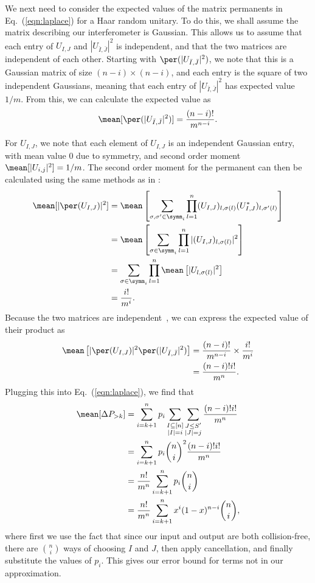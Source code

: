 We next need to consider the expected values of the matrix permanents in Eq.\ (\ref{eqn:laplace}) for a Haar random unitary. 
To do this, we shall assume the matrix describing our interferometer is Gaussian. 
This allows us to assume that each entry of $U_{I,J}$ and $|U_{\bar{I},\bar{J}}|^2$ is independent, and that the two matrices are independent of each other. 
Starting with $\per(|U_{\bar{I},\bar{J}}|^2)$, we note that this is a Gaussian matrix of size $(n-i)\times(n-i)$, and each entry is the square of two independent Gaussians, meaning that each entry of $|U_{\bar{I},\bar{J}}|^2$ has expected value $1/m$. 
From this, we can calculate the expected value as
\begin{equation}
\mean[\per(|U_{\bar{I},\bar{J}}|^2)] = \frac{(n-i)!}{m^{n-i}}.
\end{equation}

For $U_{I,J}$, we note that each element of $U_{I,J}$ is an independent Gaussian entry, with mean value $0$ due to symmetry, and second order moment $\mean[|U_{i,j}|^2] = 1/m$. The second order moment for the permanent can then be calculated using the same methods as in \cite{aaronson2011}:
\begin{align}
\mean[|\per(U_{I,J})|^2] &= \mean\left[\sum_{\sigma,\sigma'\in\symm_i}\prod_{l=1}^n(U_{I,J})_{l,\sigma(l)}(U^*_{I,J})_{l,\sigma'(l)}\right]\\
&= \mean\left[\sum_{\sigma\in\symm_i}\prod_{l=1}^n|(U_{I,J})_{l,\sigma(l)}|^2\right]\\
&= \sum_{\sigma\in\symm_i}\prod_{l=1}^n\mean\left[|U_{l,\sigma(l)}|^2\right]\\
&= \frac{i!}{m^{i}}.
\end{align}
Because the two matrices are independent~\cite{renema2018}, we can express the expected value of their product as
\begin{align}
\mean\left[|\per(U_{I,J})|^2\per(|U_{\bar{I},\bar{J}}|^2)\right] &= \frac{(n-i)!}{m^{n-i}}\times\frac{i!}{m^{i}}\\
&= \frac{(n-i)!i!}{m^n}.
\end{align}
Plugging this into Eq.\ (\ref{eqn:laplace}), we find that
\begin{align}
\mean[\Delta P_{>k}] &= \sum_{i=k+1}^np_i\sum_{\substack{I\subseteq[n]\\|I|=i}}\sum_{\substack{J\leq S'\\|J|=j}}\frac{(n-i)!i!}{m^n}\\
&= \sum_{i=k+1}^np_i\binom{n}{i}^2\frac{(n-i)!i!}{m^n}\\
&= \frac{n!}{m^n}\sum_{i=k+1}^np_i\binom{n}{i}\\
&= \frac{n!}{m^n}\sum_{i=k+1}^nx^i(1-x)^{n-i}\binom{n}{i},
\end{align}
where first we use the fact that since our input and output are both collision-free, there are $\binom{n}{i}$ ways of choosing $I$ and $J$, then apply cancellation, and finally substitute the values of $p_i$. 
This gives our error bound for terms not in our approximation.

